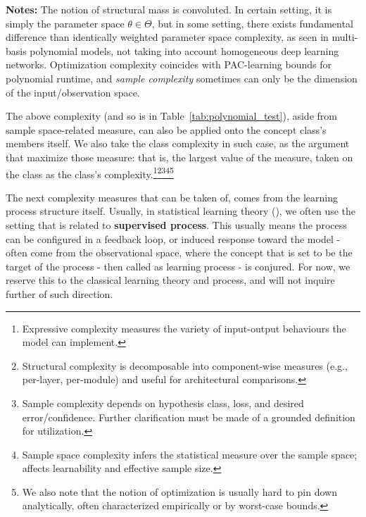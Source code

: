 \documentclass[
  journal=largetwo,
  year=2025,
  volume=37,
]{cup-journal}
\begin{document}
\begin{table}[htb]
\begin{threeparttable}
    \begin{tablenotes}
      \footnotesize
      \item[] \textbf{Notes:} The notion of structural mass is convoluted. In certain setting, it is simply the parameter space $\theta\in\Theta$, but in some setting, there exists fundamental difference than identically weighted parameter space complexity, as seen in multi-basis polynomial models, not taking into account homogeneous deep learning networks. Optimization complexity coincides with PAC-learning bounds for polynomial runtime, and \textit{sample complexity} sometimes can only be the dimension of the input/observation space.
    \end{tablenotes}
  \end{threeparttable}
\end{table}

The above complexity (and so is in Table~\ref{tab:polynomial_test}), aside from sample space-related measure, can also be applied onto the concept class's members itself. We also take the class complexity in such case, as the argument that maximize those measure: that is, the largest value of the measure, taken on the class as the class's complexity.\footnote{Expressive complexity measures the variety of input-output behaviours the model can implement.}\footnote{Structural complexity is decomposable into component-wise measures (e.g., per-layer, per-module) and useful for architectural comparisons.}\footnote{Sample complexity depends on hypothesis class, loss, and desired error/confidence. Further clarification must be made of a grounded definition for utilization.}\footnote{Sample space complexity infers the statistical measure over the sample space; affects learnability and effective sample size.}\footnote{We also note that the notion of optimization is usually hard to pin down analytically, often characterized empirically or by worst-case bounds.}

The next complexity measures that can be taken of, comes from the learning process structure itself. Usually, in statistical learning theory (\cite{STL_Hajek_Maxim_2021,10.5555/2371238,10.5555/2621980}), we often use the setting that is related to \textbf{supervised process}. This usually means the process can be configured in a feedback loop, or induced response toward the model - often come from the observational space, where the concept that is set to be the target of the process - then called as learning process - is conjured. For now, we reserve this to the classical learning theory and process, and will not inquire further of such direction. 
\end{document}
